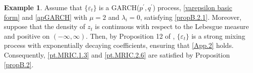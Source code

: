 \documentclass[ejsv2]{imsart}
\theoremstyle{plain}
\theoremstyle{definition}
\newtheorem{example}{Example}[section]
\theoremstyle{remark}
\begin{document}
\begin{example}
\label{ex3.1}
 Assume that $\{\varepsilon_t\}$ %
is a GARCH($p^\prime,q^\prime$) process,
\eqref{varepsilon basic form} and
\eqref{apGARCH}
with
$\mu=2$ and $\lambda_i=0$,
satisfying \eqref{propB.2.1}. Moreover, suppose that the density of $z_t$ is continuous with respect to the Lebesgue measure and positive on $(-\infty,\infty)$. Then, by Proposition 12 of \cite{Carrasco2002}, $\{\varepsilon_t\}$ is a strong mixing process with exponentially decaying coefficients, ensuring that \eqref{App.2} holds. Consequently,
\eqref{pt.MRIC.1.3} and \eqref{pt.MRIC.2.6} are satisfied by Proposition \ref{propB.2}.

\end{example}
\end{document}
